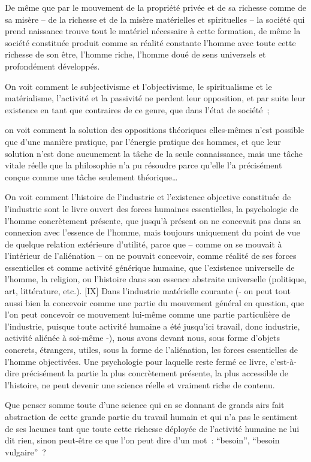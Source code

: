 \documentclass[french,twoside]{book} %
\begin{document}
De même que par le mouvement de la propriété privée et de sa richesse comme de sa misère – de la richesse et de la misère matérielles et spirituelles – la société qui prend naissance trouve tout le matériel nécessaire à cette formation, de même la société constituée produit comme sa réalité constante l’homme avec toute cette richesse de son être, l’homme riche, l’homme doué de sens universels et profondément développés.\par
On voit comment le subjectivisme et l’objectivisme, le spiritualisme et le matérialisme, l’activité et la passivité ne perdent leur opposition, et par suite leur existence en tant que contraires de ce genre, que dans l’état de société ;\par
on voit comment la solution des oppositions théoriques elles-mêmes n’est possible que d’une manière pratique, par l’énergie pratique des hommes, et que leur solution n’est donc aucunement la tâche de la seule connaissance, mais une tâche vitale réelle que la philosophie n’a pu résoudre parce qu’elle l’a précisément conçue comme une tâche seulement théorique…\par
On voit comment l’histoire de l’industrie et l’existence objective constituée de l’industrie sont le livre ouvert des forces humaines essentielles, la psychologie de l’homme concrètement présente, que jusqu’à présent on ne concevait pas dans sa connexion avec l’essence de l’homme, mais toujours uniquement du point de vue de quelque relation extérieure d’utilité, parce que – comme on se mouvait à l’intérieur de l’aliénation – on ne pouvait concevoir, comme réalité de ses forces essentielles et comme activité générique humaine, que l’existence universelle de l’homme, la religion, ou l’histoire dans son essence abstraite universelle (politique, art, littérature, etc.). [IX] Dans l’industrie matérielle courante (- on peut tout aussi bien la concevoir comme une partie du mouvement général en question, que l’on peut concevoir ce mouvement lui-même comme une partie particulière de l’industrie, puisque toute activité humaine a été jusqu’ici travail, donc industrie, activité aliénée à soi-même -), nous avons devant nous, sous forme d’objets concrets, étrangers, utiles, sous la forme de l’aliénation, les forces essentielles de l’homme objectivées. Une psychologie pour laquelle reste fermé ce livre, c’est-à-dire précisément la partie la plus concrètement présente, la plus accessible de l’histoire, ne peut devenir une science réelle et vraiment riche de contenu.\par
Que penser somme toute d’une science qui en se donnant de grands airs fait abstraction de cette grande partie du travail humain et qui n’a pas le sentiment de ses lacunes tant que toute cette richesse déployée de l’activité humaine ne lui dit rien, sinon peut-être ce que l’on peut dire d’un mot : “besoin”, “besoin vulgaire” ?\par
\end{document}
